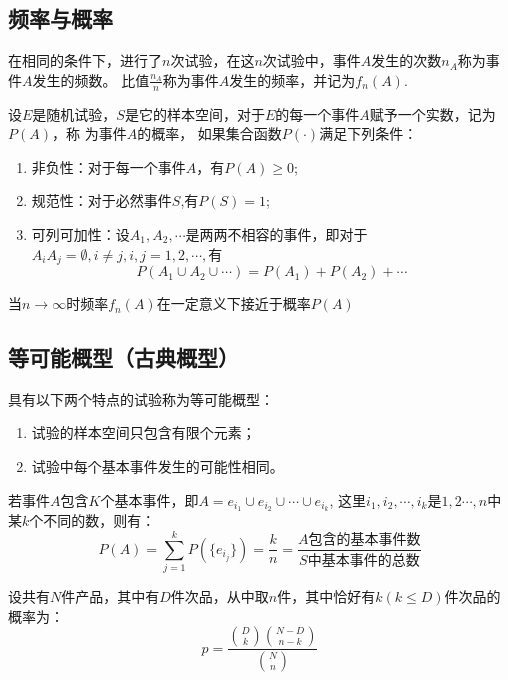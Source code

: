 \subsection{频率与概率}
\begin{definition}[频率]
  在相同的条件下，进行了$n$次试验，在这$n$次试验中，事件$A$发生的次数$n_A$称为事件$A$发生的频数。
  比值$\frac{n_A}{n}$称为事件$A$发生的频率，并记为$f_n(A)$. 
\end{definition}


\begin{definition}[概率]
  设$E$是随机试验，$S$是它的样本空间，对于$E$的每一个事件$A$赋予一个实数，记为$P(A)$，称
  为事件$A$的概率，
  如果集合函数$P(\cdot)$满足下列条件：
  \begin{enumerate}
    \item {\heiti 非负性：}对于每一个事件$A$，有$P(A)\geq 0$;
    \item {\heiti 规范性：}对于必然事件$S$,有$P(S)=1$;
    \item {\heiti 可列可加性：}设$A_1,A_2,\cdots$是两两不相容的事件，即对于$A_iA_j=\emptyset,i\neq j,i,j=1,2,\cdots,$有
    $$P(A_1\cup A_2\cup\cdots)=P(A_1)+P(A_2)+\cdots$$
  \end{enumerate}
  当$n\to \infty$时频率$f_n(A)$在一定意义下接近于概率$P(A)$
\end{definition}

\subsection{等可能概型（古典概型）}
\begin{definition}[等可能概型]
  具有以下两个特点的试验称为等可能概型：
  \begin{enumerate}
    \item 试验的样本空间只包含有限个元素；
    \item 试验中每个基本事件发生的可能性相同。
  \end{enumerate}
\end{definition}

\begin{theorem}
  若事件$A$包含$K$个基本事件，即$A={e_{i_1}}\cup{e_{i_2}}\cup\cdots\cup{e_{i_k}}$,
  这里$i_1,i_2,\cdots,i_k$是$1,2\cdots,n$中某$k$个不同的数，则有：
  $$P(A)=\sum_{j = 1}^{k}P(\{e_{i_j}\})=\frac{k}{n}=\frac{A\mbox{包含的基本事件数}}{S\mbox{中基本事件的总数}}$$  
\end{theorem}

\begin{theorem}[超几何分布的概率公式]
  设共有$N$件产品，其中有$D$件次品，从中取$n$件，其中恰好有$k(k\leq D)$件次品的概率为：
  $$p=\frac{\binom{D}{k}\binom{N-D}{n-k}}{\binom{N}{n} }$$
\end{theorem}

